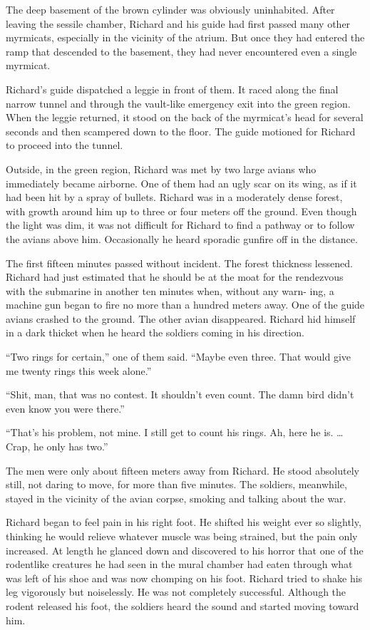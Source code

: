 \documentclass[]{article}
\begin{document}
{{The deep basement of the brown cylinder was obviously uninhabited. After leaving the sessile chamber, Richard and his guide had first passed many other myrmicats, especially in the vicinity of the atrium. But once they had entered the ramp that descended to the basement, they had never encountered even a single myrmicat.

Richard’s guide dispatched a leggie in front of them. It raced along the final narrow tunnel and through the vault-like emergency exit into the green region. When the leggie returned, it stood on the back of the myrmicat’s head for several seconds and then scampered down to the floor. The guide motioned for Richard to proceed into the tunnel.

Outside, in the green region, Richard was met by two large avians who immediately became airborne. One of them had an ugly scar on its wing, as if it had been hit by a spray of bullets. Richard was in a moderately dense forest, with growth around him up to three or four meters off the ground. Even though the light was dim, it was not difficult for Richard to find a pathway or to follow the avians above him. Occasionally he heard sporadic gunfire off in the distance.

The first fifteen minutes passed without incident. The forest thickness lessened. Richard had just estimated that he should be at the moat for the rendezvous with the submarine in another ten minutes when, without any warn- ing, a machine gun began to fire no more than a hundred meters away. One of the guide avians crashed to the ground. The other avian disappeared. Richard hid himself in a dark thicket when he heard the soldiers coming in his direction.

“Two rings for certain,” one of them said. “Maybe even three. That would give me twenty rings this week alone.”

“Shit, man, that was no contest. It shouldn’t even count. The damn bird didn’t even know you were there.”

“That’s his problem, not mine. I still get to count his rings. Ah, here he is. … Crap, he only has two.”

The men were only about fifteen meters away from Richard. He stood absolutely still, not daring to move, for more than five minutes. The soldiers, meanwhile, stayed in the vicinity of the avian corpse, smoking and talking about the war.

Richard began to feel pain in his right foot. He shifted his weight ever so slightly, thinking he would relieve whatever muscle was being strained, but the pain only increased. At length he glanced down and discovered to his horror that one of the rodentlike creatures he had seen in the mural chamber had eaten through what was left of his shoe and was now chomping on his foot. Richard tried to shake his leg vigorously but noiselessly. He was not completely successful. Although the rodent released his foot, the soldiers heard the sound and started moving toward him.

}}
\end{document}
